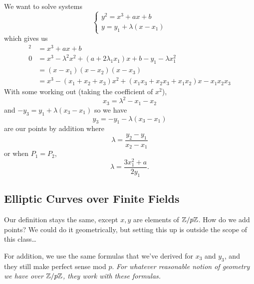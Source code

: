 \begin{itemize}
          We want to solve systems
          \[\begin{cases}
                  y^2 = x^3 + ax + b \\
                  y = y_1 + \lambda(x-x_1)
              \end{cases}\]
          which gives us
          \begin{align*}
              [y_1 + \lambda(x - x_1)]^2 & = x^3 + ax + b                                       \\
              0                          & = x^3 - \boxed{\lambda^2}x^2 + (a + 2\lambda_1 x_1)x
              + b-y_1 - \lambda x_1^2                                                           \\
                                         & = (x-x_1)(x-x_2)(x-x_3)                              \\
                                         & = x^3 - \boxed{(x_1+x_2+x_3)}x^2 +
              (x_1x_3 + x_2x_3 + x_1x_2)x - x_1x_2x_3
          \end{align*}
          With some working out (taking the coefficient of $x^2$), \[\boxed{x_3 = \lambda^2 - x_1 - x_2}\] and $-y_3 = y_1 + \lambda(x_3 - x_1)$ so we have \[\boxed{y_3 = -y_1 - \lambda(x_3 - x_1)}\] are our points by addition where
          \[\lambda = \frac{y_2 - y_1}{x_2 - x_1}\]
          or when $P_1 = P_2$,
          \[\lambda = \frac{3x_1^2 + a}{2y_1}.\]
\end{itemize}

\subsection{Elliptic Curves over Finite Fields}
Our definition stays the same, except $x, y$ are elements of $\mathbb Z/p\mathbb Z$. How do we add points? We could do it geometrically, but setting this up is outside the scope of this class\dots

For addition, we use the same formulas that we've derived for $x_3$ and $y_3$, and they still make perfect sense mod $p$. \emph{For whatever reasonable notion of geometry we have over $\mathbb Z/p\mathbb Z$, they work with these formulas.}

